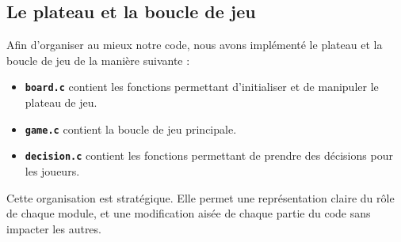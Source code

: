\subsection*{Le plateau et la boucle de jeu}
Afin d'organiser au mieux notre code, nous avons implémenté le plateau et la boucle de jeu de la manière suivante :
\begin{itemize}
    \setlength\itemsep{0.01em}
    \item \textbf{\texttt{board.c}} contient les fonctions permettant d'initialiser et de manipuler le plateau de jeu.
    \item \textbf{\texttt{game.c}} contient la boucle de jeu principale.
    \item \textbf{\texttt{decision.c}} contient les fonctions permettant de prendre des décisions pour les joueurs.
\end{itemize}
Cette organisation est stratégique. Elle permet une représentation claire du rôle de chaque module, et une modification aisée de chaque partie du code sans impacter les autres.
